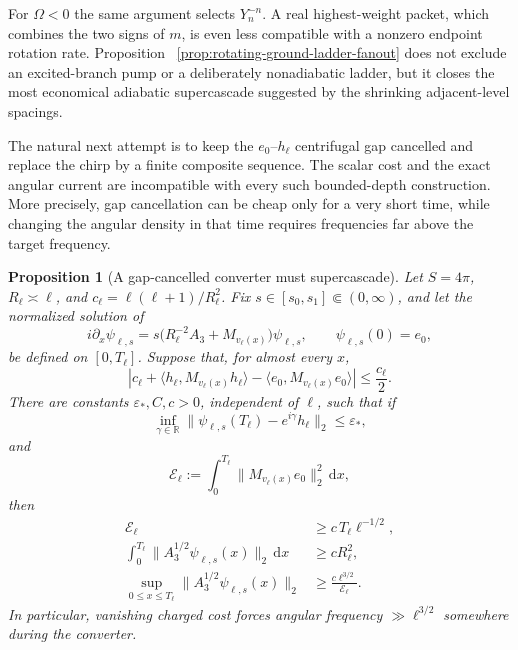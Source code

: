 \documentclass[11pt]{article}
\newcommand{\dd}{\,\mathrm d}
\newtheorem{proposition}[theorem]{Proposition}
\theoremstyle{definition}
\theoremstyle{remark}
\begin{document}
For $\Omega<0$ the same argument selects $Y_n^{-n}$.  A real highest-weight
packet, which combines the two signs of $m$, is even less compatible with a
nonzero endpoint rotation rate.  Proposition
~\ref{prop:rotating-ground-ladder-fanout} does not exclude an excited-branch
pump or a deliberately nonadiabatic ladder, but it closes the most economical
adiabatic supercascade suggested by the shrinking adjacent-level spacings.

The natural next attempt is to keep the $e_0$--$h_\ell$ centrifugal gap
cancelled and replace the chirp by a finite composite sequence.  The scalar
cost and the exact angular current are incompatible with every such
bounded-depth construction.  More precisely, gap cancellation can be cheap
only for a very short time, while changing the angular density in that time
requires frequencies far above the target frequency.

\begin{proposition}[A gap-cancelled converter must supercascade]
\label{prop:gap-cancelled-supercascade}
Let $S=4\pi$, $R_\ell\asymp\ell$, and
$c_\ell=\ell(\ell+1)/R_\ell^2$.  Fix
$s\in[s_0,s_1]\Subset(0,\infty)$, and let the normalized solution of
\begin{equation}
 i\partial_x\psi_{\ell,s}
 =s\bigl(R_\ell^{-2}A_3+M_{v_\ell(x)}\bigr)\psi_{\ell,s},
 \qquad \psi_{\ell,s}(0)=e_0,
 \label{eq:gap-cancelled-evolution}
\end{equation}
be defined on $[0,T_\ell]$.  Suppose that, for almost every $x$,
\begin{equation}
 \left|c_\ell
 +\langle h_\ell,M_{v_\ell(x)}h_\ell\rangle
 -\langle e_0,M_{v_\ell(x)}e_0\rangle\right|
 \leq\frac{c_\ell}{2}.
 \label{eq:gap-cancellation-hypothesis}
\end{equation}
There are constants $\varepsilon_*,C,c>0$, independent of $\ell$, such that
if
\begin{equation}
 \inf_{\gamma\in\mathbb R}
 \|\psi_{\ell,s}(T_\ell)-e^{i\gamma}h_\ell\|_2
 \leq\varepsilon_*,
 \label{eq:gap-cancelled-conversion}
\end{equation}
and
\begin{equation}
 \mathcal E_\ell
 :=\int_0^{T_\ell}\|M_{v_\ell(x)}e_0\|_2^2\dd x,
\end{equation}
then
\begin{align}
 \mathcal E_\ell&\geq c\,T_\ell\ell^{-1/2},
 \label{eq:gap-cancelled-cost-time}\\
 \int_0^{T_\ell}\|A_3^{1/2}\psi_{\ell,s}(x)\|_2\dd x
 &\geq cR_\ell^2,
 \label{eq:gap-cancelled-current-time}\\
 \sup_{0\leq x\leq T_\ell}
 \|A_3^{1/2}\psi_{\ell,s}(x)\|_2
 &\geq \frac{c\ell^{3/2}}{\mathcal E_\ell}.
 \label{eq:gap-cancelled-supercascade}
\end{align}
In particular, vanishing charged cost forces angular frequency
$\gg\ell^{3/2}$ somewhere during the converter.
\end{proposition}
\end{document}
